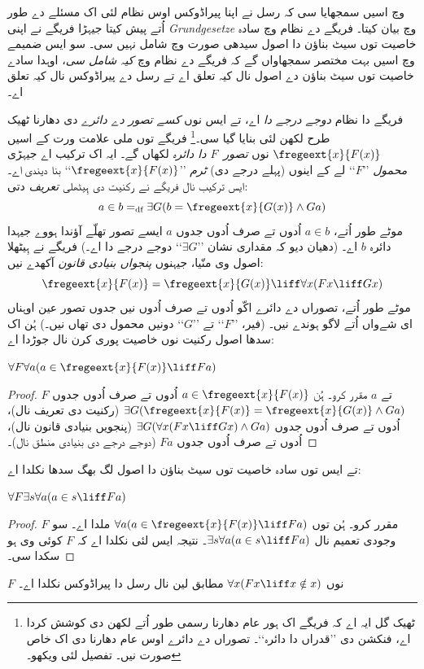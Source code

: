 \documentclass[../../../include/open-logic-section]{subfiles}
\begin{document}


 وچ اسیں سمجھایا سی کہ رسل نے اپنا پیراڈوکس اوس نظام لئی
اک مسئلے دے طور اُتے پیش کیتا جیہڑا فریگے نے اپنی \emph{Grundgesetze} وچ
بیان کیتا۔ فریگے دے نظام وچ سادہ خاصیت توں سیٹ بناؤن دا اصول سیدھی صورت
وچ شامل نہیں سی۔ سو ایس ضمیمے وچ اسیں بہت مختصر سمجھاواں گے کہ فریگے دے
نظام وچ \emph{کیہ شامل سی}، اوہدا سادے خاصیت توں سیٹ بناؤن دے اصول نال
کیہ تعلق اے تے رسل دے پیراڈوکس نال کیہ تعلق اے۔

فریگے دا نظام \emph{دوجے درجے دا} اے، تے ایس نوں \emph{کسے تصور دے
دائرے} دی دھارنا ٹھیک طرح لکھن لئی بنایا گیا سی۔\footnote{ٹھیک گل ایہ اے
کہ فریگے اک ہور عام دھارنا رسمی طور اُتے لکھن دی کوشش کردا اے، فنکشن
دی ’’قدراں دا دائرہ‘‘۔ تصوراں دے دائرے اوس عام دھارنا دی اک خاص صورت
نیں۔ تفصیل لئی \citet[pp.\ 8--9]{Heck2012} ویکھو۔} فریگے توں ملی علامت
ورت کے اسیں $\fregeext{x}{F(x)}$ نوں \emph{تصور~$F$ دا دائرہ} لکھاں گے۔
ایہ اک ترکیب اے جیہڑی \emph{محمول} ’’$F$‘‘ لے کے اینوں (پہلے درجے دی)
\emph{ٹرم} ’’$\fregeext{x}{F(x)}$‘‘ بنا دیندی اے۔ ایس ترکیب نال فریگے
نے رکنیت دی ہِیٹھلی \emph{تعریف} دتی:
\[
	a \in b =_\text{df} \exists G(b = \fregeext{x}{G(x)} \land Ga)
\]
موٹے طور اُتے، $a \in b$ اُدوں تے صرف اُدوں جدوں $a$ ایسے تصور تھلّے آؤندا
ہووے جیہدا دائرہ $b$ اے۔ (دھیان دیو کہ مقداری نشان ’’$\exists G$‘‘ دوجے
درجے دا اے۔) فریگے نے ہِیٹھلا اصول وی منّیا، جیہنوں \emph{پنجواں بنیادی قانون}
آکھدے نیں:
$$\fregeext{x}{F(x)} = \fregeext{x}{G(x)} \liff \forall x (Fx \liff Gx)$$
موٹے طور اُتے، تصوراں دے دائرے اکّو اُدوں تے صرف اُدوں نیں جدوں تصور
عین اوہناں ای شےواں اُتے لاگو ہوندے نیں۔ (فیر، ’’$F$‘‘ تے ’’$G$‘‘
دونیں محمول دی تھاں نیں۔) ہُن اک سدھا اصول رکنیت نوں خاصیت پوری کرن نال
جوڑدا اے:

\begin{lem}
$\forall F \forall a(a \in \fregeext{x}{F(x)} \liff Fa)$
\end{lem}

\begin{proof}
$F$ تے $a$ مقرر کرو۔ ہُن $a \in \fregeext{x}{F(x)}$ اُدوں تے صرف اُدوں
جدوں $\exists G(\fregeext{x}{F(x)} = \fregeext{x}{G(x)} \land Ga)$
(رکنیت دی تعریف نال)، اُدوں تے صرف اُدوں جدوں
$\exists G(\forall x(Fx \liff Gx) \land Ga)$ (پنجویں بنیادی قانون نال)،
اُدوں تے صرف اُدوں جدوں $Fa$ (دوجے درجے دی بنیادی منطق نال)۔
\end{proof}

تے ایس توں سادہ خاصیت توں سیٹ بناؤن دا اصول لگ بھگ سدھا نکلدا اے:

\begin{lem}
$\forall F \exists s \forall a (a \in s \liff Fa)$
\end{lem}

\begin{proof}
$F$ مقرر کرو۔ ہُن  توں
$\forall a (a \in \fregeext{x}{F(x)} \liff Fa)$ ملدا اے۔ سو وجودی
تعمیم نال $\exists s\forall a(a \in s \liff Fa)$۔ نتیجہ ایس لئی نکلدا اے
کہ $F$ کوئی وی ہو سکدا سی۔
\end{proof}

$F$ نوں $\forall x(Fx \liff x \notin x)$ مطابق لین نال رسل دا پیراڈوکس نکلدا اے۔
\end{document}
